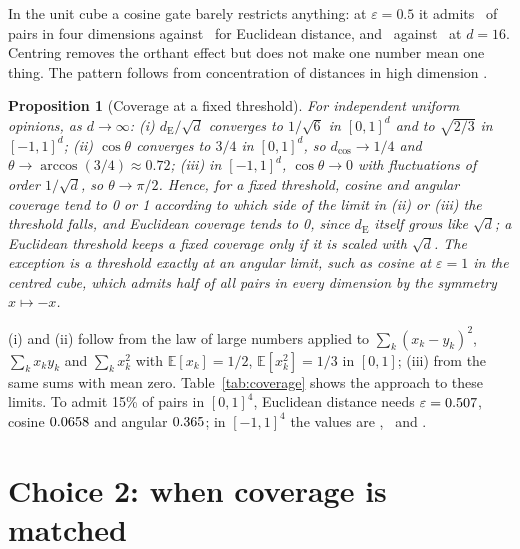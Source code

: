 \documentclass[11pt]{article}
\newtheorem{proposition}{Proposition}
\begin{document}
\begin{table}[t]
\centering
\small

\caption{Share of uniformly drawn pairs admitted at one shared $\varepsilon$, by opinion space and dimension.}
\label{tab:coverage}
\end{table}

In the unit cube a cosine gate barely restricts anything: at $\varepsilon = 0.5$ it admits \UnitFourCos\ of pairs in four dimensions against \UnitFourEuc\ for Euclidean distance, and \UnitSixteenCos\ against \UnitSixteenEuc\ at $d=16$.
Centring removes the orthant effect but does not make one number mean one thing.
The pattern follows from concentration of distances in high dimension \citep{aggarwal2001}.

\begin{proposition}[Coverage at a fixed threshold]
\label{prop:concentration}
For independent uniform opinions, as $d \to \infty$:
(i) $d_{\mathrm{E}}/\sqrt{d}$ converges to $1/\sqrt6$ in $[0,1]^d$ and to $\sqrt{2/3}$ in $[-1,1]^d$;
(ii) $\cos\theta$ converges to $3/4$ in $[0,1]^d$, so $d_{\cos} \to 1/4$ and $\theta \to \arccos(3/4) \approx 0.72$;
(iii) in $[-1,1]^d$, $\cos\theta \to 0$ with fluctuations of order $1/\sqrt d$, so $\theta \to \pi/2$.
Hence, for a fixed threshold, cosine and angular coverage tend to 0 or 1 according to which side of the limit in (ii) or (iii) the threshold falls, and Euclidean coverage tends to 0, since $d_{\mathrm{E}}$ itself grows like $\sqrt d$; a Euclidean threshold keeps a fixed coverage only if it is scaled with $\sqrt d$.
The exception is a threshold exactly at an angular limit, such as cosine at $\varepsilon = 1$ in the centred cube, which admits half of all pairs in every dimension by the symmetry $x \mapsto -x$.
\end{proposition}
\noindent (i) and (ii) follow from the law of large numbers applied to $\sum_k (x_k - y_k)^2$, $\sum_k x_k y_k$ and $\sum_k x_k^2$ with $\mathbb{E}[x_k]=1/2$, $\mathbb{E}[x_k^2]=1/3$ in $[0,1]$; (iii) from the same sums with mean zero.
Table~\ref{tab:coverage} shows the approach to these limits.
To admit 15\% of pairs in $[0,1]^4$, Euclidean distance needs $\varepsilon = 0.507$, cosine $0.0658$ and angular $0.365$; in $[-1,1]^4$ the values are \MatchCentredEuc, \MatchCentredCos\ and \MatchCentredAng.

\section{Choice 2: when coverage is matched}
\label{sec:matching}
\end{document}
